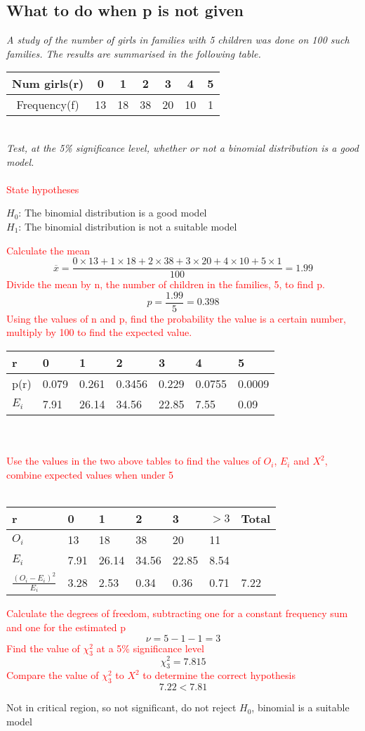 \documentclass{article}[18pt]
\begin{document}
\subsection{What to do when p is not given}
\textit{A study of the number of girls in families with 5 children was done on 100 such families. The results are summarised in the following table.}\\
\begin{tabular}{|c|c|c|c|c|c|c|}
\hline
Num girls(r)&0&1&2&3&4&5\\
\hline
Frequency(f)&13&18&38&20&10&1\\
\hline
\end{tabular}\\
\textit{Test, at the 5\% significance level, whether or not a binomial distribution is a good model.}\\
\\
\textcolor{red}{State hypotheses}
\begin{center}
$H_0$: The binomial distribution is a good model\\
$H_1$: The binomial distribution is not a suitable model
\end{center}
\textcolor{red}{Calculate the mean}
$$\overline{x}=\frac{0\times13+1\times18+2\times38+3\times20+4\times10+5\times1}{100}=1.99$$
\textcolor{red}{Divide the mean by n, the number of children in the families, 5, to find p.}
$$p=\frac{1.99}{5}=0.398$$
\textcolor{red}{Using the values of n and p, find the probability the value is a certain number, multiply by 100 to find the expected value.}
\begin{tabularx}{\textwidth}{|X|X|X|X|X|X|X|}
\hline
r&0&1&2&3&4&5\\
\hline
p(r)&0.079&0.261&0.3456&0.229&0.0755&0.0009\\
\hline
$E_i$&7.91&26.14&34.56&22.85&7.55&0.09\\
\hline
\end{tabularx}\\
\\
\textcolor{red}{Use the values in the two above tables to find the values of $O_i$, $E_i$ and $X^2$, combine expected values when under 5}\\
\\
\begin{tabularx}{\textwidth}{|X|X|X|X|X|X|X|}
\hline
r&0&1&2&3&$>3$&Total\\
\hline
$O_i$&13&18&38&20&11&\\
\hline
$E_i$&7.91&26.14&34.56&22.85&8.54&\\
\hline
$\frac{(O_i-E_i)^2}{E_i}$&3.28&2.53&0.34&0.36&0.71&7.22\\
\hline
\end{tabularx}
\textcolor{red}{Calculate the degrees of freedom, subtracting one for a constant frequency sum and one for the estimated p}
$$\nu=5-1-1=3$$
\textcolor{red}{Find the value of $\chi^2_3$ at a 5\% significance level}
$$\chi^2_3=7.815$$
\textcolor{red}{Compare the value of $\chi^2_3$ to $X^2$ to determine the correct hypothesis}
$$7.22<7.81$$
\begin{center}
Not in critical region, so not significant, do not reject $H_0$, binomial is a suitable model
\end{center}
\newpage
\end{document}
